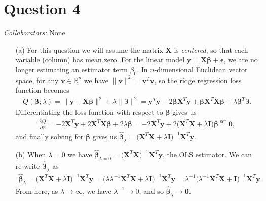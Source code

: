 \documentclass[10pt]{article}
\newcommand{\mycolaba}[1]{\textcolor{colabcol}{\textsl{Collaborators:}} #1}
\begin{document}
\section{Question 4} \noindent
\mycolaba{None}
\begin{itemize}
    \item[(a)] For this question we will assume the matrix \(\mathbf{X}\) is \textsl{centered}, so that each variable (column) has mean zero. 
    For the linear model \(\mathbf{y} = \mathbf{X} \bm{\beta} + \bm{\epsilon}\), we are no longer estimating an estimator term \(\beta_0\). 
    In \(n\)-dimensional Euclidean vector space, for any \(\mathbf{v} \in \mathbb{R}^n\) we have \(\|\mathbf{v}\|^2 = \mathbf{v}^T\mathbf{v}\), 
    so the ridge regression loss function becomes 
    \begin{align*}
        Q(\bm{\beta}; \lambda) 
        = \| \mathbf{y} - \mathbf{X}\bm{\beta} \|^2 + \lambda \|\bm{\beta}\|^2
        = \mathbf{y}^T\mathbf{y} - 2 \bm{\beta}\mathbf{X}^T\mathbf{y} + \bm{\beta} \mathbf{X}^T \mathbf{X} \bm{\beta} + \lambda \bm{\beta}^T \bm{\beta}.
    \end{align*}
    Differentiating the loss function with respect to \(\bm{\beta}\) gives us 
    \begin{align*}
        \frac{\partial Q}{\partial \bm{\beta}}
        = -2 \mathbf{X}^T \mathbf{y} + 2 \mathbf{X}^T\mathbf{X}\bm{\beta} + 2 \lambda \bm{\beta}
        = -2 \mathbf{X}^T \mathbf{y} + 2 \big( \mathbf{X}^T\mathbf{X} + \lambda \mathbf{I} \big) \bm{\beta}
        \overset{\text{set}}{=} \mathbf{0},
    \end{align*}
    and finally solving for \(\bm{\beta}\) gives us 
    \(\hat{\bm{\beta}}_{\lambda} = \big( \mathbf{X}^T\mathbf{X} + \lambda \mathbf{I} \big)^{-1} \mathbf{X}^T\mathbf{y}\).
    \item[(b)] When \(\lambda = 0\) we have \(\hat{\bm{\beta}}_{\lambda = 0} = \big( \mathbf{X}^T\mathbf{X} \big)^{-1} \mathbf{X}^T\mathbf{y}\), the OLS 
    estimator. We can re-write \(\hat{\bm{\beta}}_{\lambda}\) as 
    \begin{align*}
        \hat{\bm{\beta}}_{\lambda}
        = \big( \mathbf{X}^T \mathbf{X} + \lambda \mathbf{I} \big)^{-1} \mathbf{X}^T \mathbf{y}
        = \big( \lambda \lambda^{-1} \mathbf{X}^T \mathbf{X} + \lambda \mathbf{I} \big)^{-1} \mathbf{X}^T \mathbf{y}
        = \lambda^{-1} \big( \lambda^{-1} \mathbf{X}^T \mathbf{X} + \mathbf{I} \big)^{-1} \mathbf{X}^T \mathbf{y}.
    \end{align*}
    From here, as \(\lambda \to \infty\), we have \(\lambda^{-1} \to 0\), and so \(\hat{\bm{\beta}}_{\lambda} \to \mathbf{0}\).

\end{itemize}
\end{document}
